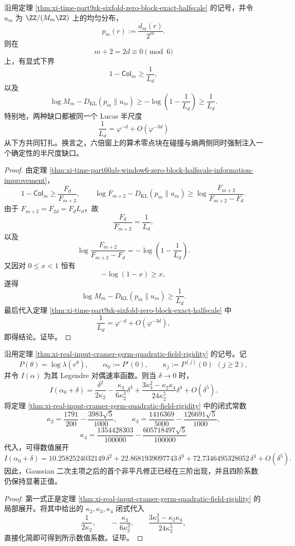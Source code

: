 \begin{theorem}\label{thm:xi-time-part9zk-sixfold-notch-collision-entropy}
沿用定理 \ref{thm:xi-time-part9zk-sixfold-zero-block-exact-halfscale} 的记号，并令 \(u_m\) 为 \(\ZZ/(M_m\ZZ)\) 上的均匀分布，
\[
p_m(r):=\frac{d_m(r)}{2^m}.
\]
则在
\[
m+2=2d\equiv 0\pmod 6
\]
上，有显式下界
\[
1-\mathsf{Col}_m
\ge
\frac{1}{L_d},
\]
以及
\[
\log M_m-D_{\mathrm{KL}}(p_m\|u_m)
\ge
-\log\!\left(1-\frac{1}{L_d}\right)
\ge
\frac{1}{L_d}.
\]
特别地，两种缺口都被同一个 Lucas 半尺度
\[
\frac{1}{L_d}
=
\varphi^{-d}+O(\varphi^{-3d})
\]
从下方共同钉扎。换言之，六倍窗上的算术零点块在碰撞与熵两侧同时强制注入一个确定性的半尺度缺口。
\end{theorem}
\begin{proof}
由定理 \ref{thm:xi-time-part60ab-window6-zero-block-halfscale-information-improvement}，
\[
1-\mathsf{Col}_m
\ge
\frac{F_d}{F_{m+2}},
\qquad
\log F_{m+2}-D_{\mathrm{KL}}(p_m\|u_m)
\ge
\log\frac{F_{m+2}}{F_{m+2}-F_d}.
\]
由于 \(F_{m+2}=F_{2d}=F_dL_d\)，故
\[
\frac{F_d}{F_{m+2}}=\frac{1}{L_d},
\]
以及
\[
\log\frac{F_{m+2}}{F_{m+2}-F_d}
=
-\log\!\left(1-\frac{1}{L_d}\right).
\]
又因对 \(0\le x<1\) 恒有
\[
-\log(1-x)\ge x,
\]
遂得
\[
\log M_m-D_{\mathrm{KL}}(p_m\|u_m)
\ge
\frac{1}{L_d}.
\]
最后代入定理 \ref{thm:xi-time-part9zk-sixfold-zero-block-exact-halfscale} 中
\[
\frac{1}{L_d}=\varphi^{-d}+O(\varphi^{-3d}),
\]
即得结论。证毕。
\end{proof}

\begin{theorem}\label{thm:xi-time-part9zk-output-cramer-legendre-fourth-order}
沿用定理 \ref{thm:xi-real-input-cramer-germ-quadratic-field-rigidity} 的记号。记
\[
P(\theta)=\log\lambda(e^\theta),
\qquad
\alpha_0:=P'(0),
\qquad
\kappa_j:=P^{(j)}(0)\ \ (j\ge 2),
\]
并令 \(I(\alpha)\) 为其 Legendre 对偶速率函数。则当 \(\delta\to 0\) 时，
\[
I(\alpha_0+\delta)
=
\frac{\delta^2}{2\kappa_2}
-\frac{\kappa_3}{6\kappa_2^3}\delta^3
+
\frac{3\kappa_3^2-\kappa_2\kappa_4}{24\kappa_2^5}\delta^4
+
O(\delta^5).
\]
将定理 \ref{thm:xi-real-input-cramer-germ-quadratic-field-rigidity} 中的闭式常数
\[
\kappa_2=\frac{1791}{200}-\frac{3983\sqrt5}{1000},
\qquad
\kappa_3=\frac{1416369}{5000}-\frac{126691\sqrt5}{1000},
\]
\[
\kappa_4=\frac{1354428303}{100000}-\frac{605718497\sqrt5}{100000}
\]
代入，可得数值展开
\[
I(\alpha_0+\delta)
=
10.2582524032149\,\delta^2
+
22.8681939097743\,\delta^3
+
72.7346495328052\,\delta^4
+
O(\delta^5).
\]
因此，Gaussian 二次主项之后的首个非平凡修正已经在三阶出现，并且四阶系数仍保持显著正值。
\end{theorem}
\begin{proof}
第一式正是定理 \ref{thm:xi-real-input-cramer-germ-quadratic-field-rigidity} 的局部展开。将其中给出的 \(\kappa_2,\kappa_3,\kappa_4\) 闭式代入
\[
\frac{1}{2\kappa_2},
\qquad
-\frac{\kappa_3}{6\kappa_2^3},
\qquad
\frac{3\kappa_3^2-\kappa_2\kappa_4}{24\kappa_2^5},
\]
直接化简即可得到所示数值系数。证毕。
\end{proof}

